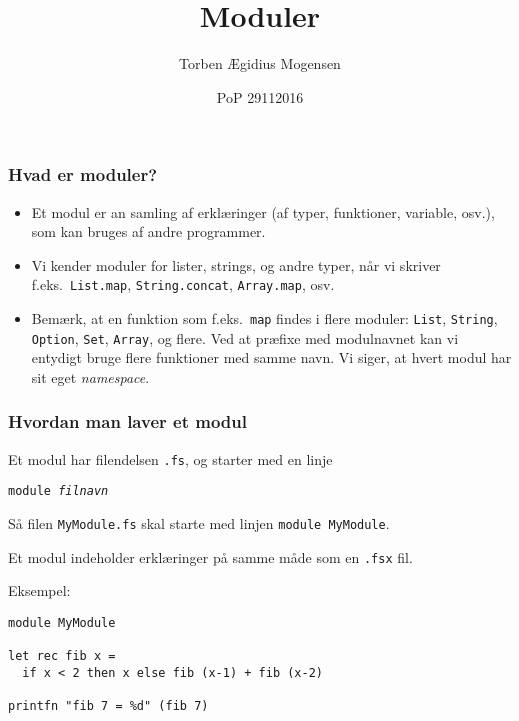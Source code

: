 \documentclass{beamer}
\title{Moduler}
\date[2016]{PoP 29112016}
\author{Torben Ægidius Mogensen}
\begin{document}
\begin{frame}
\titlepage
\end{frame}






\begin{frame}%
\frametitle{Hvad er moduler?}

\begin{itemize}
\item 
Et modul er an samling af erklæringer (af typer, funktioner, variable,
osv.), som kan bruges af andre programmer.

\item 
Vi kender moduler for lister, strings, og andre typer, når vi skriver
f.eks.~\texttt{List.map}, \texttt{String.concat}, \texttt{Array.map},
osv.

\item 
Bemærk, at en funktion som f.eks.\ \texttt{map} findes i flere
moduler: \texttt{List}, \texttt{String}, \texttt{Option},
\texttt{Set}, \texttt{Array}, og flere. Ved at præfixe med modulnavnet
kan vi entydigt bruge flere funktioner med samme navn.  Vi siger, at
hvert modul har sit eget \emph{namespace}.

\end{itemize}
\end{frame}

\begin{frame}[fragile=singleslide]
\frametitle{Hvordan man laver et modul}

Et modul har filendelsen \texttt{.fs}, og starter med en linje

\vspace{1ex}
\texttt{module \emph{filnavn}}

\vspace{1ex}
Så filen \texttt{MyModule.fs} skal starte med linjen \texttt{module
  MyModule}.

\vspace{2ex}
Et modul indeholder erklæringer på samme måde som en \texttt{.fsx}
fil.

\vspace{1ex}
Eksempel:

\renewcommand{\baselinestretch}{0.9}
\begin{verbatim}
module MyModule

let rec fib x =
  if x < 2 then x else fib (x-1) + fib (x-2)

printfn "fib 7 = %d" (fib 7)
\end{verbatim}
\renewcommand{\baselinestretch}{1.0}

\end{frame}
\end{document}
